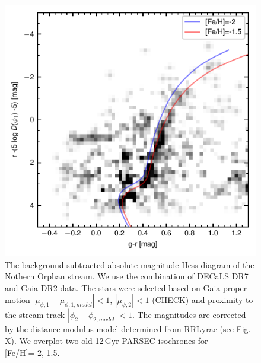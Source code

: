 \documentclass[a4paper,useAMS,usenatbib]{mnras}
\begin{document}
%
\begin{figure}
\includegraphics{decals_gaia_cmd.pdf}
\caption{The background subtracted absolute magnitude Hess diagram of
  the Nothern Orphan stream. We use the combination of DECaLS DR7 and
  Gaia DR2 data. The stars were selected based on Gaia proper motion
  $|\mu_{\phi,1}-\mu_{\phi,1,model}|<1$, $|\mu_{\phi,2}|<1$ (CHECK)
  and proximity to the stream track $|\phi_2 - \phi_{2,model}|<1$. The
  magnitudes are corrected by the distance modulus model determined
  from RRLyrae (see Fig. X). We overplot two old 12\,Gyr PARSEC
  isochrones for [Fe/H]=-2,-1.5.  }
\label{fig:cmd_decals}
\end{figure}
%
\end{document}
